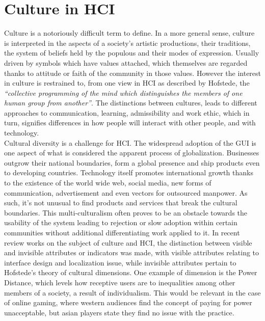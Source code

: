 \section{Culture in HCI} \label{sec:cul_HCI}
    Culture is a notoriously difficult term to define. In a more general sense, culture is interpreted in the aspects of a society’s artistic productions, their traditions, the system of beliefs held by the populous and their modes of expression. Usually driven by symbols which have values attached, which themselves are regarded thanks to attitude or faith of the community in those values. However the interest in culture is restrained to, from one view in HCI as described by Hofstede\cite{hofstede1986}, the \emph{“collective programming of the mind which distinguishes the members of one human group from another”}. The distinctions between cultures, leads to different approaches to communication, learning, admissibility and work ethic, which in turn, signifies differences in how people will interact with other people, and with technology.\\
    Cultural diversity is a challenge for HCI. The widespread adoption of the GUI is one aspect of what is considered the apparent process of globalization. Businesses outgrow their national boundaries, form a global presence and ship products even to developing countries. Technology itself promotes international growth thanks to the existence of the world wide web, social media, new forms of communication, advertisement and even vectors for outsourced manpower. As such, it’s not unusual to find products and services that break the cultural boundaries. This multi-culturalism often proves to be an obstacle towards the usability of the system\cite{mapp2004} leading to rejection or slow adoption within certain communities without additional differentiating work applied to it. In recent review works on the subject of culture and HCI, the distinction between visible and invisible attributes or indicators was made, with visible attributes relating to interface design and localization issue, while invisible attributes pertain to Hofstede’s theory of cultural dimensions\cite{hofstede1986}\cite{mintu1992cultures}. One example of dimension is the Power Distance, which levels how receptive users are to inequalities among other members of a society, a result of individualism\cite{erumban2006}. This would be relevant in the case of online gaming, where western audiences find the concept of paying for power unacceptable, but asian players state they find no issue with the practice.\\
